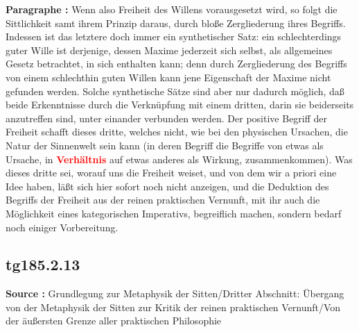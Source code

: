 \documentclass[a4paper,12pt,twoside]{book}
\newcommand{\match}[1]{\textcolor{red}{\textbf{#1}}}
\begin{document}
	\textbf{Paragraphe : }Wenn also Freiheit des Willens vorausgesetzt wird, so folgt die Sittlichkeit samt ihrem Prinzip daraus, durch bloße Zergliederung ihres Begriffs. Indessen ist das letztere doch immer ein synthetischer Satz: ein schlechterdings guter Wille ist derjenige, dessen Maxime jederzeit sich selbst, als allgemeines Gesetz betrachtet, in sich enthalten kann; denn durch Zergliederung des Begriffs von einem schlechthin guten Willen kann jene Eigenschaft der Maxime nicht gefunden werden. Solche synthetische Sätze sind aber nur dadurch möglich, daß beide Erkenntnisse durch die Verknüpfung mit einem dritten, darin sie beiderseits anzutreffen sind, unter einander verbunden werden. Der positive Begriff der Freiheit schafft dieses dritte, welches nicht, wie bei den physischen Ursachen, die Natur der Sinnenwelt sein kann (in deren Begriff die Begriffe von etwas als Ursache, in \match{Verhältnis} auf etwas anderes als Wirkung, zusammenkommen). Was dieses dritte sei, worauf uns die Freiheit weiset, und von dem wir a priori eine Idee haben, läßt sich hier sofort noch nicht anzeigen, und die Deduktion des Begriffs der Freiheit aus der reinen praktischen Vernunft, mit ihr auch die Möglichkeit eines kategorischen Imperativs, begreiflich machen, sondern bedarf noch einiger Vorbereitung. 
	
	\subsection*{tg185.2.13} 
	\textbf{Source : }Grundlegung zur Metaphysik der Sitten/Dritter Abschnitt: Übergang von der Metaphysik der Sitten zur Kritik der reinen praktischen Vernunft/Von der äußersten Grenze aller praktischen Philosophie\\  
	
\end{document}
